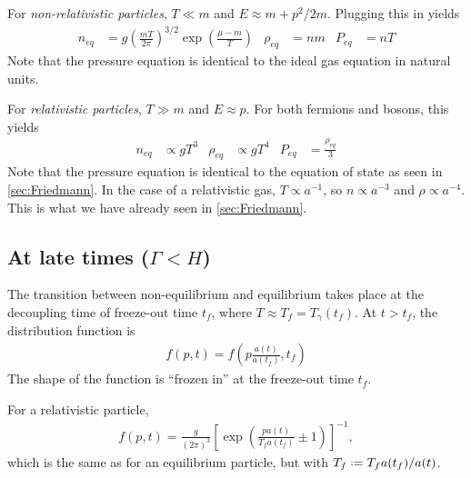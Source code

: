 For \emph{non-relativistic particles}, $T \ll m$ and $E \approx m + p^2/2m$. Plugging this in yields
\begin{align*}
	n_{eq} &= g \left( \frac{m T}{2 \pi} \right)^{3/2} \exp\left( \frac{\mu-m}{T} \right)&
	\rho_{eq} &= n m&
	P_{eq} &= n T
\end{align*}
Note that the pressure equation is identical to the ideal gas equation in natural units. 

For \emph{relativistic particles}, $T \gg m$ and $E \approx p$. For both fermions and bosons, this yields
\begin{align*}
	n_{eq} &\propto g T^3&
	\rho_{eq} &\propto g T^4&
	P_{eq} &= \frac{\rho_{eq}}{3}
\end{align*}
Note that the pressure equation is identical to the equation of state as seen in \cref{sec:Friedmann}.
In the case of a relativistic gas, $T \propto a^{-1}$, so $n \propto a^{-3}$ and $\rho \propto a^{-4}$. This is what we have already seen in \cref{sec:Friedmann}.




\subsection{At late times ($\Gamma < H$)}
\label{ssec:late-times}
The transition between non-equilibrium and equilibrium takes place at the decoupling time of freeze-out time $t_f$, where $T \approx T_f = T_{\gamma}(t_f)$. At $t>t_f$, the distribution function is
\begin{align*}
	f(p,t) = f\left( p \frac{a(t)}{a(t_f)}, t_f \right)
\end{align*}
The shape of the function is \enquote{frozen in} at the freeze-out time $t_f$.

For a relativistic particle,
\begin{align*}
	f(p,t) =
	 \frac{g}{(2\pi)^3} \left[ \exp\left( 
		\frac{p a(t)}{T_f a(t_f)} \pm 1
	 	\right) \right]^{-1},
\end{align*}
which is the same as for an equilibrium particle, but with $T_f \defeq T_f a(t_f)/a(t)$.



